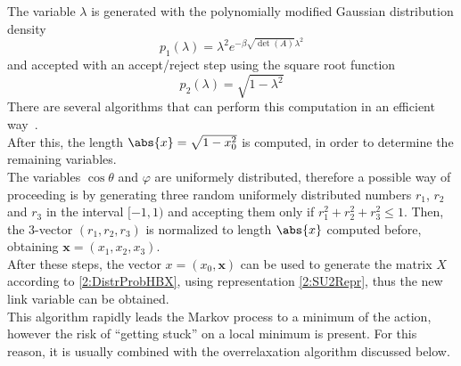 The variable $\lambda$ is generated with the polynomially modified Gaussian distribution density
\begin{equation}
    p_1(\lambda) = \lambda^2 e^{-\beta \sqrt{\det(A)}\lambda^2}
\end{equation}
and accepted with an accept/reject step using the square root function
\begin{equation}
    p_2(\lambda) = \sqrt{1-\lambda^2}
\end{equation}
There are several algorithms that can perform this computation in an efficient way~\cite{1998art, luscher1994portable}.\\
After this, the length $\abs{x} = \sqrt{1-x_0^2}$ is computed, in order to determine the remaining variables.\\
The variables $\cos\theta$ and $\varphi$ are uniformely distributed, therefore a possible way of proceeding is by generating three random uniformely distributed numbers $r_1$, $r_2$ and $r_3$ in the interval $[-1,1)$ and accepting them only if $r_1^2+r_2^2+r_3^2\leq1$.
Then, the $3$-vector $(r_1,r_2,r_3)$ is normalized to length $\abs{x}$ computed before, obtaining $\bm{x} = (x_1,x_2,x_3)$.\\
After these steps, the vector $x=(x_0,\bm{x})$ can be used to generate the matrix $X$ according to \eqref{2:DistrProbHBX}, using representation \eqref{2:SU2Repr}, thus the new link variable can be obtained.\\
This algorithm rapidly leads the Markov process to a minimum of the action, however the risk of ``getting stuck'' on a local minimum is present.
For this reason, it is usually combined with the overrelaxation algorithm discussed below.


